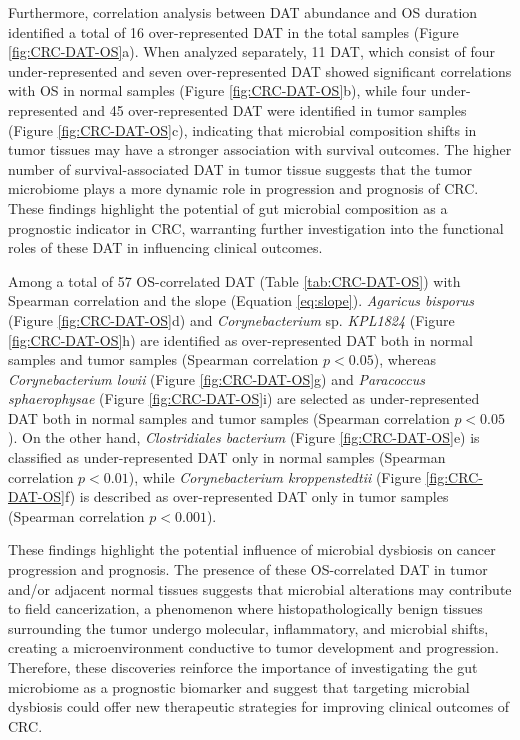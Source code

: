 \documentclass[11pt, a4paper, onecolumn, oneside]{report}
\begin{document}
                Furthermore, correlation analysis between DAT abundance and OS duration identified a total of 16 over-represented DAT in the total samples (Figure \ref{fig:CRC-DAT-OS}a). When analyzed separately, 11 DAT, which consist of four under-represented and seven over-represented DAT showed significant correlations with OS in normal samples (Figure \ref{fig:CRC-DAT-OS}b), while four under-represented and 45 over-represented DAT were identified in tumor samples (Figure \ref{fig:CRC-DAT-OS}c), indicating that microbial composition shifts in tumor tissues may have a stronger association with survival outcomes. The higher number of survival-associated DAT in tumor tissue suggests that the tumor microbiome plays a more dynamic role in progression and prognosis of CRC. These findings highlight the potential of gut microbial composition as a prognostic indicator in CRC, warranting further investigation into the functional roles of these DAT in influencing clinical outcomes.

                Among a total of 57 OS-correlated DAT (Table \ref{tab:CRC-DAT-OS}) with Spearman correlation and the slope (Equation \ref{eq:slope}). \textit{Agaricus bisporus} (Figure \ref{fig:CRC-DAT-OS}d) and \textit{Corynebacterium} sp. \textit{KPL1824} (Figure \ref{fig:CRC-DAT-OS}h) are identified as over-represented DAT both in normal samples and tumor samples (Spearman correlation $p < 0.05$), whereas \textit{Corynebacterium lowii} (Figure \ref{fig:CRC-DAT-OS}g) and \textit{Paracoccus sphaerophysae} (Figure \ref{fig:CRC-DAT-OS}i) are selected as under-represented DAT both in normal samples and tumor samples (Spearman correlation $p < 0.05$). On the other hand, \textit{Clostridiales bacterium} (Figure \ref{fig:CRC-DAT-OS}e) is classified as under-represented DAT only in normal samples (Spearman correlation $p < 0.01$), while \textit{Corynebacterium kroppenstedtii} (Figure \ref{fig:CRC-DAT-OS}f) is described as over-represented DAT only in tumor samples (Spearman correlation $p < 0.001$).

                These findings highlight the potential influence of microbial dysbiosis on cancer progression and prognosis. The presence of these OS-correlated DAT in tumor and/or adjacent normal tissues suggests that microbial alterations may contribute to field cancerization, a phenomenon where histopathologically benign tissues surrounding the tumor undergo molecular, inflammatory, and microbial shifts, creating a microenvironment conductive to tumor development and progression. Therefore, these discoveries reinforce the importance of investigating the gut microbiome as a prognostic biomarker and suggest that targeting microbial dysbiosis could offer new therapeutic strategies for improving clinical outcomes of CRC.
\end{document}
